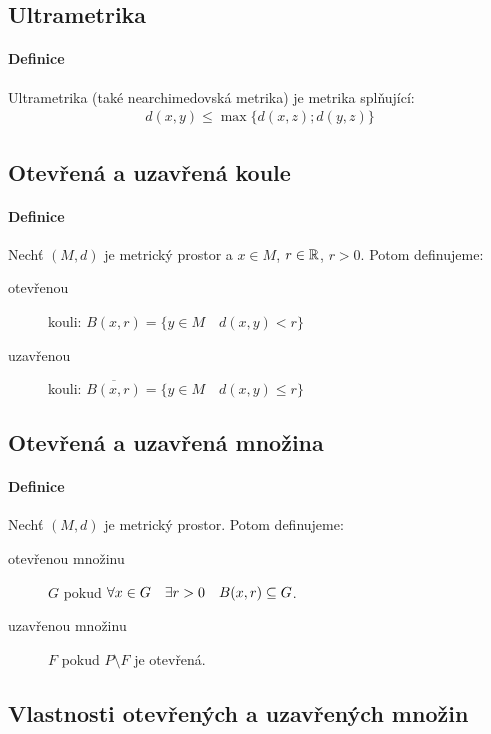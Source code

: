 \documentclass[a4paper,10pt]{article}
\begin{document}
\subsection{Ultrametrika}
\setcounter{equation}{0}
\paragraph{Definice}
Ultrametrika (také nearchimedovská metrika) je metrika splňující:
\begin{align*}
	d(x,y) \le \max \{ d(x,z); d(y,z) \}
\end{align*}

\subsection{Otevřená a uzavřená koule}
\setcounter{equation}{0}
\paragraph{Definice}
Nechť $(M, d)$ je metrický prostor a $x \in M$, $r \in \mathbb{R}$, $r > 0$. Potom
definujeme:
\begin{description}
	\item[otevřenou] kouli: 
		$B(x, r) = \{ y \in M \quad d(x,y) < r\}$
	\item[uzavřenou] kouli: 
		$\overline{B(x, r)} = \{ y \in M \quad d(x,y) \le r\}$
\end{description}


\subsection{Otevřená a uzavřená množina}
\setcounter{equation}{0}
\paragraph{Definice}
Nechť $(M, d)$ je metrický prostor. Potom definujeme:
\begin{description}
	\item[otevřenou množinu] $G$ pokud $\forall x \in G \quad \exists r > 0 \quad
	B(x,r) \subseteq G$.
	\item[uzavřenou množinu] $F$ pokud $P \setminus F$ je otevřená.
\end{description}

\subsection{Vlastnosti otevřených a uzavřených množin}
\setcounter{equation}{0}
\end{document}
